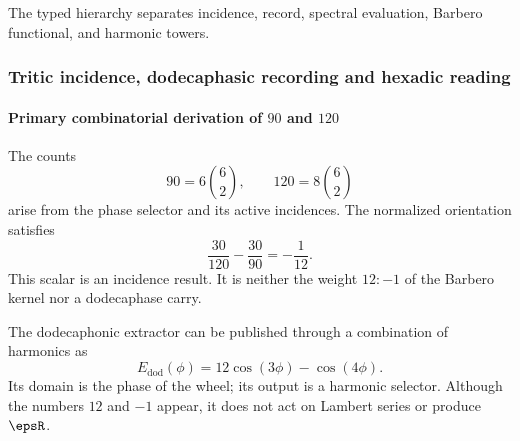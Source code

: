 \noindent The typed hierarchy separates incidence, record, spectral evaluation, Barbero functional, and harmonic towers.\par\medskip

\subsubsection{Tritic incidence, dodecaphasic recording and hexadic reading}

\paragraph{Primary combinatorial derivation of \(90\) and \(120\)}

The counts
\[
90=6\binom62,
\qquad
120=8\binom62
\]
arise from the phase selector and its active incidences. The normalized orientation satisfies
\begin{equation}
\frac{30}{120}-\frac{30}{90}=-\frac1{12}.
\label{eq:minus-one-twelve}
\end{equation}
This scalar is an incidence result. It is neither the weight \(12:-1\) of the
Barbero kernel nor a dodecaphase carry.

The dodecaphonic extractor can be published through a combination of
harmonics as
\[
E_{\mathrm{dod}}(\phi)=12\cos(3\phi)-\cos(4\phi).
\]
Its domain is the phase of the wheel; its output is a harmonic selector. Although
the numbers \(12\) and \(-1\) appear, it does not act on Lambert series or
produce \(\epsR\).

